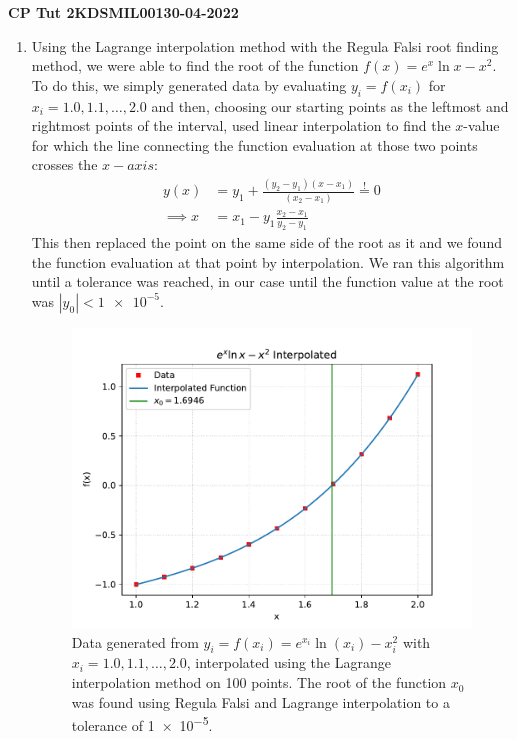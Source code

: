 \documentclass[11pt]{article}
\begin{document}
\begin{center}
    \textbf{CP Tut 2}\hspace{2in}\textbf{KDSMIL001}\hspace{2in}\textbf{30-04-2022}
\end{center}

\begin{enumerate}
    \item Using the Lagrange interpolation method with the Regula Falsi root finding method, we were able to find the root of the function $f(x)=e^x \ln x-x^2$. \\
    To do this, we simply generated data by evaluating $y_i=f(x_i)$ for $x_i=1.0, 1.1, \dots, 2.0$ and then, choosing our starting points as the leftmost and rightmost points of the interval, used linear interpolation to find the $x$-value for which the line connecting the function evaluation at those two points crosses the $x-axis$:
    \begin{align*}
        y(x)&=y_1+\frac{(y_2-y_1)(x-x_1)}{(x_2-x_1)} \overset ! = 0\\
        \implies x&=x_1-y_1\frac{x_2-x_1}{y_2-y_1}
    \end{align*}
    This then replaced the point on the same side of the root as it and we found the function evaluation at that point by interpolation. We ran this algorithm until a tolerance was reached, in our case until the function value at the root was $|y_0|<\num{1e-5}$. 

    \begin{figure}[h]
        \begin{center}
            \includegraphics[width=.6\textwidth]{Plots/q1.pdf}
            \caption{Data generated from $y_i=f(x_i)=e^{x_i} \ln(x_i)-x_i^2$ with $x_i=1.0, 1.1, \dots, 2.0$, interpolated using the Lagrange interpolation method on 100 points. The root of the function $x_0$ was found using Regula Falsi and Lagrange interpolation to a tolerance of \num{1e-5}.}
            \label{fig:q1}
        \end{center}
    \end{figure}


\end{enumerate}
\end{document}
